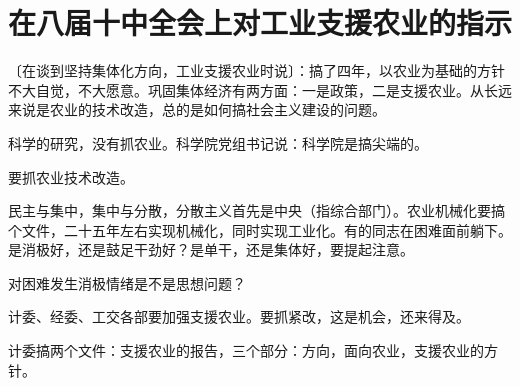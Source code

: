 \section[在八届十中全会上对工业支援农业的指示（一九六二年七月二十四日）]{在八届十中全会上对工业支援农业的指示}


〔在谈到坚持集体化方向，工业支援农业时说〕：搞了四年，以农业为基础的方针不大自觉，不大愿意。巩固集体经济有两方面：一是政策，二是支援农业。从长远来说是农业的技术改造，总的是如何搞社会主义建设的问题。

科学的研究，没有抓农业。科学院党组书记说：科学院是搞尖端的。

要抓农业技术改造。

民主与集中，集中与分散，分散主义首先是中央（指综合部门）。农业机械化要搞个文件，二十五年左右实现机械化，同时实现工业化。有的同志在困难面前躺下。是消极好，还是鼓足干劲好？是单干，还是集体好，要提起注意。

对困难发生消极情绪是不是思想问题？

计委、经委、工交各部要加强支援农业。要抓紧改，这是机会，还来得及。

计委搞两个文件：支援农业的报告，三个部分：方向，面向农业，支援农业的方针。

